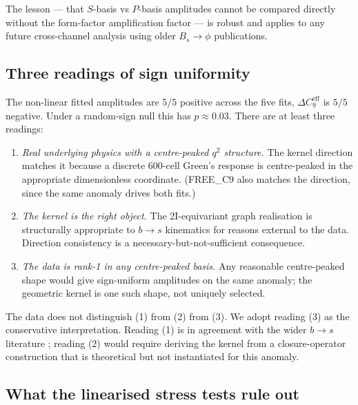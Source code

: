 The lesson — that $S$-basis vs $P$-basis amplitudes cannot be
compared directly without the form-factor amplification factor — is
robust and applies to any future cross-channel analysis using older
$B_{s}\!\to\!\phi$ publications.

\subsection{Three readings of sign uniformity}

The non-linear fitted amplitudes are $5/5$ positive across the five
fits, $\Delta C_{9}^{\mathrm{eff}}$ is $5/5$ negative. Under a
random-sign null this has $p\approx 0.03$. There are at least three
readings:
\begin{enumerate}
\item \emph{Real underlying physics with a centre-peaked $q^{2}$
  structure.} The kernel direction matches it because a discrete
  600-cell Green's response is centre-peaked in the appropriate
  dimensionless coordinate. (FREE\_C9 also matches the direction,
  since the same anomaly drives both fits.)
\item \emph{The kernel is the right object.} The 2I-equivariant graph
  realisation is structurally appropriate to $b\to s$ kinematics for
  reasons external to the data. Direction consistency is a
  necessary-but-not-sufficient consequence.
\item \emph{The data is rank-1 in any centre-peaked basis.} Any
  reasonable centre-peaked shape would give sign-uniform amplitudes
  on the same anomaly; the geometric kernel is one such shape, not
  uniquely selected.
\end{enumerate}
The data does not distinguish (1) from (2) from (3). We adopt
reading (3) as the conservative interpretation. Reading (1) is in
agreement with the wider $b\to s$ literature
\citep{Descotes2013P5p,AltmannshoferStraub2013}; reading (2) would
require deriving the kernel from a closure-operator construction
\citep{SmartAdaptiveClosureTransport2026} that is theoretical but not
instantiated for this anomaly.

\subsection{What the linearised stress tests rule out}

